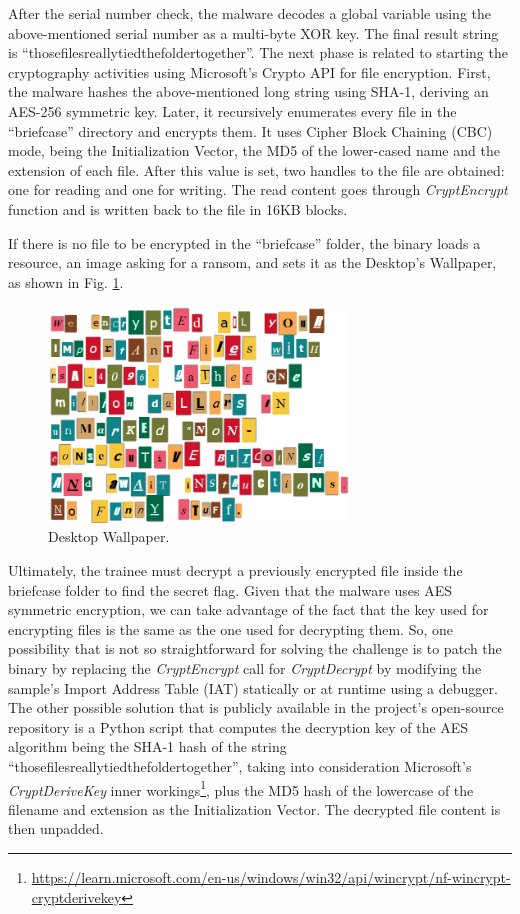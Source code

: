 After the serial number check, the malware decodes a global variable using the above-mentioned serial number as a multi-byte XOR key. The final result string is ``thosefilesreallytiedthefoldertogether''. The next phase is related to starting the cryptography activities using Microsoft's Crypto API for file encryption. First, the malware hashes the above-mentioned long string using SHA-1, deriving an AES-256 symmetric key. Later, it recursively enumerates every file in the ``briefcase'' directory and encrypts them. It uses Cipher Block Chaining (CBC) mode, being the Initialization Vector, the MD5 of the lower-cased name and the extension of each file. After this value is set, two handles to the file are obtained: one for reading and one for writing. The read content goes through \textit{CryptEncrypt} function and is written back to the file in 16KB blocks.

If there is no file to be encrypted in the ``briefcase'' folder, the binary loads a resource, an image asking for a ransom, and sets it as the Desktop's Wallpaper, as shown in Fig. \ref{fig:ida_5}.

\begin{figure}[H]
    \includegraphics[width=8cm]{figures/ida_5.png}
    \caption{Desktop Wallpaper.}
    \label{fig:ida_5}
\end{figure}

Ultimately, the trainee must decrypt a previously encrypted file inside the briefcase folder to find the secret flag. Given that the malware uses AES symmetric encryption, we can take advantage of the fact that the key used for encrypting files is the same as the one used for decrypting them. So, one possibility that is not so straightforward for solving the challenge is to patch the binary by replacing the \textit{CryptEncrypt} call for \textit{CryptDecrypt} by modifying the sample's Import Address Table (IAT) statically or at runtime using a debugger. The other possible solution that is publicly available in the project's open-source repository is a Python script that computes the decryption key of the AES algorithm being the SHA-1 hash of the string ``thosefilesreallytiedthefoldertogether'', taking into consideration Microsoft's \textit{CryptDeriveKey} inner workings\footnote{\url{https://learn.microsoft.com/en-us/windows/win32/api/wincrypt/nf-wincrypt-cryptderivekey}}, plus the MD5 hash of the lowercase of the filename and extension as the Initialization Vector. The decrypted file content is then unpadded.

